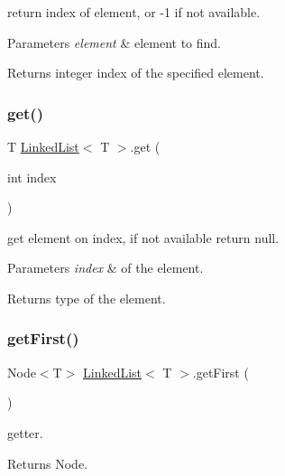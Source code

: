 return index of element, or -\/1 if not available. 
\begin{DoxyParams}{Parameters}
{\em element} & element to find. \\
\hline
\end{DoxyParams}
\begin{DoxyReturn}{Returns}
integer index of the specified element. 
\end{DoxyReturn}
\mbox{\label{class_linked_list_a032ef46fc54f12525746d9f7c3a80663}} 
\subsubsection{\texorpdfstring{get()}{get()}}
{\footnotesize\ttfamily T \mbox{\hyperlink{class_linked_list}{Linked\+List}}$<$ T $>$.get (\begin{DoxyParamCaption}\item[{int}]{index }\end{DoxyParamCaption})\hspace{0.3cm}{\ttfamily [inline]}}

get element on index, if not available return null. 
\begin{DoxyParams}{Parameters}
{\em index} & of the element. \\
\hline
\end{DoxyParams}
\begin{DoxyReturn}{Returns}
type of the element. 
\end{DoxyReturn}
\mbox{\label{class_linked_list_a97e865343f67ed5879567bfb1d362a19}} 
\subsubsection{\texorpdfstring{get\+First()}{getFirst()}}
{\footnotesize\ttfamily Node$<$T$>$ \mbox{\hyperlink{class_linked_list}{Linked\+List}}$<$ T $>$.get\+First (\begin{DoxyParamCaption}{ }\end{DoxyParamCaption})\hspace{0.3cm}{\ttfamily [inline]}}

getter. \begin{DoxyReturn}{Returns}
Node. 
\end{DoxyReturn}
\mbox{\label{class_linked_list_a7ea3fa6fa5601039076c2a6c8fe88219}} 
